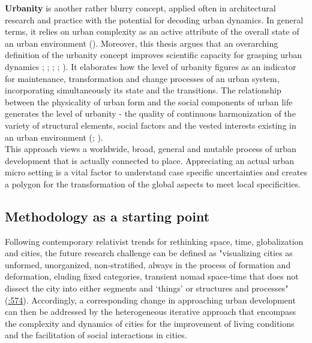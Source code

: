 \documentclass[11pt]{report}
\begin{document}
{{\textbf{Urbanity} is another rather blurry concept, applied often in architectural research and practice with the potential for decoding urban dynamics. In general terms, it relies on urban complexity as an active attribute of the overall state of an urban environment (\citealt{canuto_establishing_2012}). 
Moreover, this thesis argues that an overarching definition of the urbanity concept improves scientific capacity for grasping urban dynamics {\citealt{marcus_spatial_2007}}; \href{ref}{\citealt{zijderveld_theory_2011}}; \href{ref}{\citealt{canuto_establishing_2012}}; \href{ref}{\citealt{de_aguiar_douglas_vieira_what_2013}}; \href{ref}{\citealt{holden_justifying_2015}}).
It elaborates how the level of urbanity figures as an indicator for maintenance, transformation and change processes of an urban system, incorporating simultaneously its state and the transitions.
The relationship between the physicality of urban form and the social components of urban life generates the level of urbanity - the quality of continuous harmonization of the variety of structural elements, social factors and the vested interests existing in an urban environment (\citealt{de_holanda_exceptional_2011}; \citealt{canuto_establishing_2012}). 
\\

This approach views a worldwide, broad, general and mutable process of urban development that is actually connected to place. Appreciating an actual urban micro setting is a vital factor to understand case specific uncertainties and creates a polygon for the transformation of the global aspects to meet local specificities.  

\subsection{Methodology as a starting point}

Following contemporary relativist trends for rethinking space, time, globalization and cities, the future research challenge can be defined as "visualizing cities as unformed, unorganized, non-stratified, always in the process of formation and deformation, eluding fixed categories, transient nomad space-time that does not dissect the city into either segments and ‘things’ or structures and processes" (\href{ref}{\citealt{smith_world_2003}:574}). Accordingly, a corresponding change in approaching urban development can then be addressed by the heterogeneous iterative approach that encompass the complexity and dynamics of cities for the improvement of living conditions and the facilitation of social interactions in cities. 
\\

}}
\end{document}
